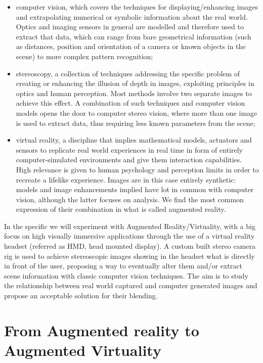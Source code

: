 \begin{itemize}
\item computer vision, which covers the techniques for displaying/enhancing images and extrapolating numerical or symbolic information about the real world. Optics and imaging sensors in general are modelled and therefore used to extract that data, which can range from bare geometrical information (such as distances, position and orientation of a camera or known objects in the scene) to more complex pattern recognition;

\item stereoscopy, a collection of techniques addressing the specific problem of creating or enhancing the illusion of depth in images, exploiting principles in optics and human perception. Most methods involve two separate images to achieve this effect. A combination of such techniques and computer vision models opens the door to computer stereo vision, where more than one image is used to extract data, thus requiring less known parameters from the scene;
\item virtual reality, a discipline that implies mathematical models, actuators and sensors to replicate real world experiences in real time in form of entirely computer-simulated environments and give them interaction capabilities. High relevance is given to human psychology and perception limits in order to recreate a lifelike experience. Images are in this case entirely synthetic: models and image enhancements implied have lot in common with computer vision, although the latter focuses on analysis. We find the most common expression of their combination in what is called augmented reality.
\end{itemize}
In the specific we will experiment with Augmented Reality/Virtuality, with a big focus on high visually immersive applications through the use of a virtual reality headset (referred as HMD, head mounted display). A custom built stereo camera rig is used to achieve stereoscopic images showing in the headset what is directly in front of the user, proposing a way to eventually alter them and/or extract scene information with classic computer vision techniques. The aim is to study the relationship between real world captured and computer generated images and propose an acceptable solution for their blending.

\section{From Augmented reality to Augmented Virtuality}

